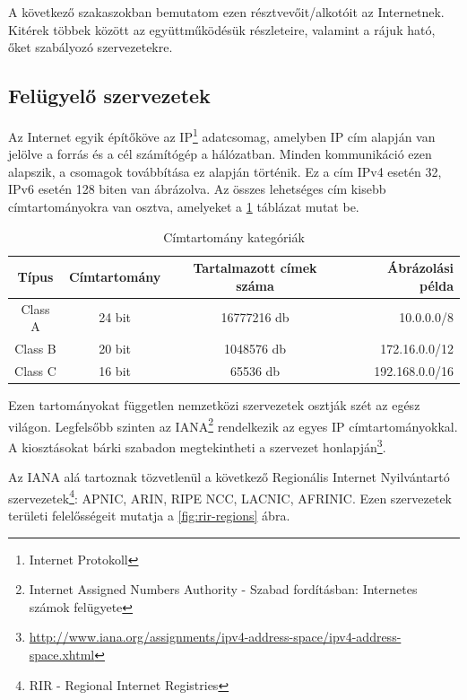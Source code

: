 A következő szakaszokban bemutatom ezen résztvevőit/alkotóit az Internetnek. Kitérek többek között az együttműködésük részleteire, valamint a rájuk ható, őket szabályozó szervezetekre.

\subsection{Felügyelő szervezetek}
Az Internet egyik építőköve az IP\footnote{Internet Protokoll} adatcsomag, amelyben IP cím alapján van jelölve a forrás és a cél számítógép a hálózatban. Minden kommunikáció ezen alapszik, a csomagok továbbítása ez alapján történik. Ez a cím IPv4 esetén 32, IPv6 esetén 128 biten van ábrázolva. Az összes lehetséges cím kisebb címtartományokra van osztva, amelyeket a \ref{tab:cimtartomanyok} táblázat mutat be.

\begin{table}[ht]
	\centering
	\caption{Címtartomány kategóriák}
	\hspace{2mm}
	\begin{tabular}{ | c | c | c | r |}
	\hline
	Típus & Címtartomány & Tartalmazott címek száma & Ábrázolási példa \\ \hline

Class A & 24 bit & 16777216 db & 10.0.0.0/8\\ \hline
Class B & 20 bit & 1048576 db & 172.16.0.0/12\\ \hline
Class C & 16 bit & 65536 db & 192.168.0.0/16\\ \hline
	\end{tabular}
	\label{tab:cimtartomanyok}
\end{table}


Ezen tartományokat független nemzetközi szervezetek osztják szét az egész világon. Legfelsőbb szinten az IANA\footnote{Internet Assigned Numbers Authority - Szabad fordításban: Internetes számok felügyete} rendelkezik az egyes IP címtartományokkal. A kiosztásokat bárki szabadon megtekintheti a szervezet honlapján\footnote{\url{http://www.iana.org/assignments/ipv4-address-space/ipv4-address-space.xhtml}}.

Az IANA alá tartoznak tözvetlenül a következő Regionális Internet Nyilvántartó szervezetek\footnote{RIR - Regional Internet Registries}: APNIC, ARIN, RIPE NCC, LACNIC, AFRINIC.
Ezen szervezetek területi felelősségeit mutatja a \ref{fig:rir-regions} ábra.

